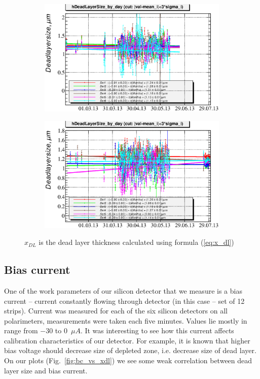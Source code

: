 \documentclass[a4paper]{article}
\begin{document}
\begin{figure}[p]
\begin{subfigure}[b]{0.5\textwidth}
\includegraphics[width=\textwidth]{gfx/run13_alpha_study/B2D/c_chDeadLayerSize_by_day_B2D.eps}
\end{subfigure}
\begin{subfigure}[b]{0.5\textwidth}
\includegraphics[width=\textwidth]{gfx/run13_alpha_study/Y2U/c_chDeadLayerSize_by_day_Y2U.eps}
\end{subfigure}
\caption{$x_{DL}$ is the dead layer thickness calculated using formula (\ref{eq:x_dl})}
\end{figure}

\subsection{Bias current}


One of the work parameters of our silicon detector that we measure is a bias current -- current
constantly flowing through detector (in this case -- set of 12 strips). Current was measured
for each of the six silicon detectors on all polarimeters, measurements were taken each five
minutes. Values lie mostly in range from $-30$ to $0$~$\mu A$. It was interesting to see how
this current affects calibration characteristics of our detector. For example, it is known 
that higher bias voltage should decrease size of depleted zone, i.e. decrease size of dead layer.
On our plots (Fig.~\ref{fig:bc_vs_xdl}) we see some weak correlation between dead layer size and bias
current.
\end{document}
